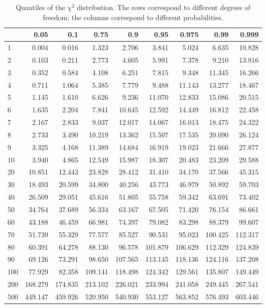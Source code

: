 \documentclass[
]{book}
\theoremstyle{definition}
\theoremstyle{definition}
\theoremstyle{definition}
\theoremstyle{definition}
\theoremstyle{remark}
\begin{document}
\begin{table}

\caption{\label{tab:Chi2}Quantiles of the $\chi^2$ distribution. The rows correspond to different degrees of freedom; the columns correspond to different probabilities.}
\centering
\begin{tabular}[t]{l|r|r|r|r|r|r|r|r}
\hline
  & 0.05 & 0.1 & 0.75 & 0.9 & 0.95 & 0.975 & 0.99 & 0.999\\
\hline
1 & 0.004 & 0.016 & 1.323 & 2.706 & 3.841 & 5.024 & 6.635 & 10.828\\
\hline
2 & 0.103 & 0.211 & 2.773 & 4.605 & 5.991 & 7.378 & 9.210 & 13.816\\
\hline
3 & 0.352 & 0.584 & 4.108 & 6.251 & 7.815 & 9.348 & 11.345 & 16.266\\
\hline
4 & 0.711 & 1.064 & 5.385 & 7.779 & 9.488 & 11.143 & 13.277 & 18.467\\
\hline
5 & 1.145 & 1.610 & 6.626 & 9.236 & 11.070 & 12.833 & 15.086 & 20.515\\
\hline
6 & 1.635 & 2.204 & 7.841 & 10.645 & 12.592 & 14.449 & 16.812 & 22.458\\
\hline
7 & 2.167 & 2.833 & 9.037 & 12.017 & 14.067 & 16.013 & 18.475 & 24.322\\
\hline
8 & 2.733 & 3.490 & 10.219 & 13.362 & 15.507 & 17.535 & 20.090 & 26.124\\
\hline
9 & 3.325 & 4.168 & 11.389 & 14.684 & 16.919 & 19.023 & 21.666 & 27.877\\
\hline
10 & 3.940 & 4.865 & 12.549 & 15.987 & 18.307 & 20.483 & 23.209 & 29.588\\
\hline
20 & 10.851 & 12.443 & 23.828 & 28.412 & 31.410 & 34.170 & 37.566 & 45.315\\
\hline
30 & 18.493 & 20.599 & 34.800 & 40.256 & 43.773 & 46.979 & 50.892 & 59.703\\
\hline
40 & 26.509 & 29.051 & 45.616 & 51.805 & 55.758 & 59.342 & 63.691 & 73.402\\
\hline
50 & 34.764 & 37.689 & 56.334 & 63.167 & 67.505 & 71.420 & 76.154 & 86.661\\
\hline
60 & 43.188 & 46.459 & 66.981 & 74.397 & 79.082 & 83.298 & 88.379 & 99.607\\
\hline
70 & 51.739 & 55.329 & 77.577 & 85.527 & 90.531 & 95.023 & 100.425 & 112.317\\
\hline
80 & 60.391 & 64.278 & 88.130 & 96.578 & 101.879 & 106.629 & 112.329 & 124.839\\
\hline
90 & 69.126 & 73.291 & 98.650 & 107.565 & 113.145 & 118.136 & 124.116 & 137.208\\
\hline
100 & 77.929 & 82.358 & 109.141 & 118.498 & 124.342 & 129.561 & 135.807 & 149.449\\
\hline
200 & 168.279 & 174.835 & 213.102 & 226.021 & 233.994 & 241.058 & 249.445 & 267.541\\
\hline
500 & 449.147 & 459.926 & 520.950 & 540.930 & 553.127 & 563.852 & 576.493 & 603.446\\
\hline
\end{tabular}
\end{table}
\end{document}
